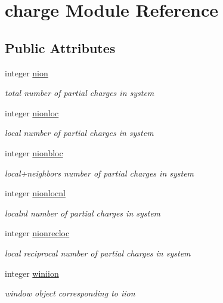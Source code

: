 \hypertarget{classcharge}{\section{charge Module Reference}
\label{classcharge}
}
\subsection*{Public Attributes}
\begin{DoxyCompactItemize}
\item 
integer \hyperlink{classcharge_aa31b8a0b3ed9d9e9598e20aedd38296f}{nion}
\begin{DoxyCompactList}\small\item\em total number of partial charges in system \end{DoxyCompactList}\item 
integer \hyperlink{classcharge_ae382bb967e8910bbad52c6091552c8ac}{nionloc}
\begin{DoxyCompactList}\small\item\em local number of partial charges in system \end{DoxyCompactList}\item 
integer \hyperlink{classcharge_a6f6fa8912d66b22787fc2369269b086d}{nionbloc}
\begin{DoxyCompactList}\small\item\em local+neighbors number of partial charges in system \end{DoxyCompactList}\item 
integer \hyperlink{classcharge_a2e77c500ea21416745665d34ec7e1f2a}{nionlocnl}
\begin{DoxyCompactList}\small\item\em localnl number of partial charges in system \end{DoxyCompactList}\item 
integer \hyperlink{classcharge_ae85bc7226e0921d2a5d04ad05cc58768}{nionrecloc}
\begin{DoxyCompactList}\small\item\em local reciprocal number of partial charges in system \end{DoxyCompactList}\item 
integer \hyperlink{classcharge_a3ff6e830154e3960da488de190bce8eb}{winiion}
\begin{DoxyCompactList}\small\item\em window object corresponding to iion \end{DoxyCompactList}\item 

\end{DoxyCompactItemize}
